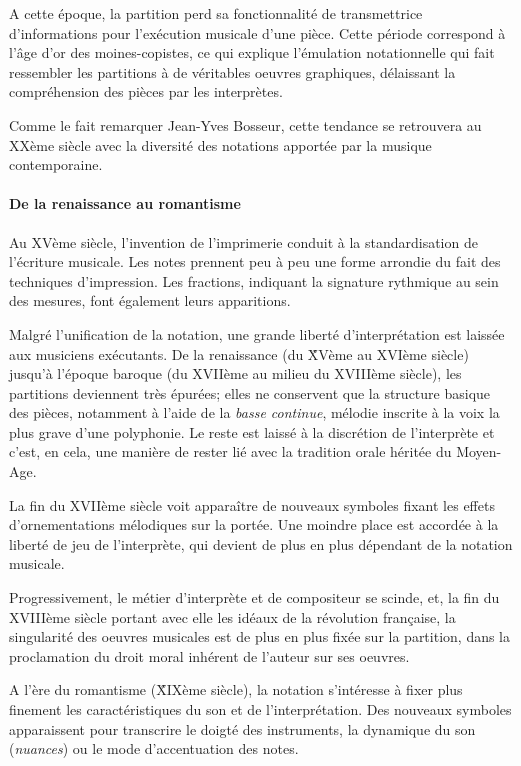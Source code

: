 A cette époque, la partition perd sa fonctionnalité de transmettrice d'informations pour l'exécution musicale d'une pièce. Cette période correspond à l'âge d'or des moines-copistes, ce qui explique l'émulation notationnelle qui fait ressembler les partitions à de véritables oeuvres graphiques, délaissant la compréhension des pièces par les interprètes.

Comme le fait remarquer Jean-Yves Bosseur, cette tendance se retrouvera au XXème siècle avec la diversité des notations apportée par la musique contemporaine. 
   
\paragraph{De la renaissance au romantisme} Au XVème siècle, l'invention de l'imprimerie conduit à la standardisation de l'écriture musicale. Les notes prennent peu à peu une forme arrondie du fait des techniques d'impression. Les fractions, indiquant la signature rythmique au sein des mesures, font également leurs apparitions. 

Malgré l'unification de la notation, une grande liberté d'interprétation est laissée aux musiciens exécutants. De la renaissance (du \~XVème au XVIème siècle) jusqu'à l'époque baroque (du XVIIème au milieu du XVIIIème siècle), les partitions deviennent très épurées; elles ne conservent que la structure basique des pièces, notamment à l'aide de la \textit{basse continue}, mélodie inscrite à la voix la plus grave d'une polyphonie. Le reste est laissé à la discrétion de l'interprète et c'est, en cela, une manière de rester lié avec la tradition orale héritée du Moyen-Age.


La fin du XVIIème siècle voit apparaître de nouveaux symboles fixant les effets d'ornementations mélodiques sur la portée. Une moindre place est accordée à la liberté de jeu de l'interprète, qui devient de plus en plus dépendant de la notation musicale.

Progressivement, le métier d'interprète et de compositeur se scinde, et, la fin du XVIIIème siècle portant avec elle les idéaux de la révolution française, la singularité des oeuvres musicales est de plus en plus fixée sur la partition, dans la proclamation du droit moral inhérent de l'auteur sur ses oeuvres.

A l'ère du romantisme (\~XIXème siècle), la notation s'intéresse à fixer plus finement les caractéristiques du son et de l'interprétation. Des nouveaux symboles apparaissent pour transcrire le doigté des instruments, la dynamique du son (\textit{nuances}) ou le mode d'accentuation des notes.

